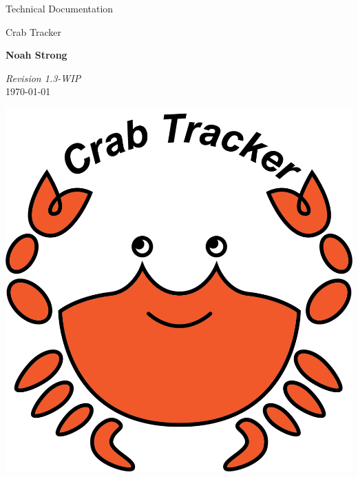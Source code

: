 \documentclass[12pt]{article}
\begin{document}
\begin{titlepage}

\vspace*{5cm}

\begin{huge}
Technical Documentation
\end{huge}

\begin{large}
Crab Tracker

\vspace*{1cm}

\textbf{Noah Strong}

\vspace*{1cm}
\end{large}

\textit{Revision 1.3-WIP}\\
\today

\vfill
\hfill \includegraphics[scale=1]{ct-logo.png}

\end{titlepage}
\tableofcontents{}

\newpage

\end{document}

